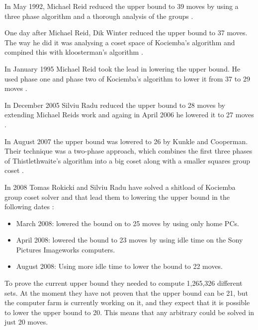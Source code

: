 In May 1992, Michael Reid reduced the upper bound to 39 moves by using a three phase algorithm and a thorough analysis of the groups \cite[p. 52]{rokickipdf}.

One day after Michael Reid, Dik Winter reduced the upper bound to 37 moves. The way he did it was analysing a coset space of Kociemba's algorithm and compined this with kloosterman's algorithm \cite[p. 53]{rokickipdf}.

In January 1995 Michael Reid took the lead in lowering the upper bound. He used phase one and phase two of Kociemba's algorithm to lower it from 37 to 29 moves \cite[p. 55]{rokickipdf}.

In December 2005 Silviu Radu reduced the upper bound to 28 moves by extending Michael Reids work and againg in April 2006 he lowered it to 27 moves \cite[p. 58]{rokickipdf}.

In August 2007 the upper bound was lowered to 26 by Kunkle and Cooperman. Their technique was a two-phase approach, which combines the first three phases of Thistlethwaite's algorithm into a big coset along with a smaller squares group coset \cite[p. 63]{rokickipdf}.

In 2008 Tomas Rokicki and Silviu Radu have solved a shitload of Kociemba group coset solver and that lead them to lowering the upper bound in the following dates \cite[p. 66]{rokickipdf}:
\begin{itemize}
\item March 2008: lowered the bound on to 25 moves by using only home PCs.
\item April 2008: lowered the bound to 23 moves by using idle time on the Sony Pictures Imageworks computers.
\item August 2008: Using more idle time to lower the bound to 22 moves.
\end{itemize}

\begin{comment}
The progression greatly accelerated when that set solver proved the first upper bound of 25 moves. This was done on home computers from October 2007 to March 2008. They only needed to solve 6000 sets, but after this they got contacted by John Welborn from Sony Pictures Imageworks and he offered a lot of idle computers from a computer farm to help on the project. 
\end{comment}

To prove the current upper bound they needed to compute 1,265,326 different sets. At the moment they have not proven that the upper bound can be 21, but the computer farm is currently working on it, and they expect that it is possible to lower the upper bound to 20. This means that any arbitrary \rubik{} could be solved in just 20 moves.
